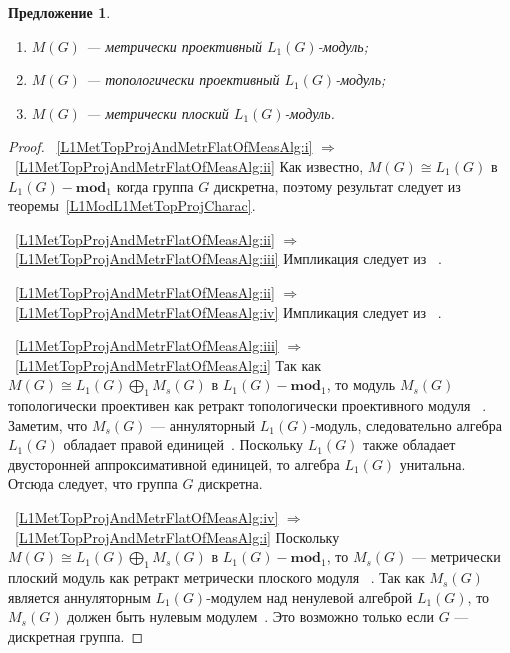 \documentclass{article}
\numberwithin{equation}{section}
\theoremstyle{plain}
\newtheorem{propos}{Предложение}
\theoremstyle{definition}
\newtheorem{proof}{Доказательство}\def\theproof{}
\newcommand{\isom}{\mathop{\mathbin{\cong}}}
\begin{document}
\begin{fulltext}
\begin{propos}
\begin{enumerate}[label = (\roman*)]
	\item $M(G)$ --- метрически проективный
	$L_1(G)$-модуль;\label{L1MetTopProjAndMetrFlatOfMeasAlg:ii}
 
	\item $M(G)$ --- топологически проективный
	$L_1(G)$-модуль;\label{L1MetTopProjAndMetrFlatOfMeasAlg:iii}
 
	\item $M(G)$ --- метрически плоский
	$L_1(G)$-модуль.\label{L1MetTopProjAndMetrFlatOfMeasAlg:iv}
\end{enumerate}
\end{propos}
\begin{proof} 
~\ref{L1MetTopProjAndMetrFlatOfMeasAlg:i} $\Longrightarrow$
~\ref{L1MetTopProjAndMetrFlatOfMeasAlg:ii} Как известно, $M(G)\isom L_1(G)$ в
$L_1(G)-\mathbf{mod}_1$ когда группа $G$ дискретна, поэтому результат следует из
теоремы~\ref{L1ModL1MetTopProjCharac}. 

~\ref{L1MetTopProjAndMetrFlatOfMeasAlg:ii} $\Longrightarrow$
~\ref{L1MetTopProjAndMetrFlatOfMeasAlg:iii} Импликация следует из
~\cite[предложение~2.4]{NemGeomProjInjFlatBanMod}.

~\ref{L1MetTopProjAndMetrFlatOfMeasAlg:ii} $\Longrightarrow$
~\ref{L1MetTopProjAndMetrFlatOfMeasAlg:iv} Импликация следует из
~\cite[предложение~2.26]{NemGeomProjInjFlatBanMod}.

~\ref{L1MetTopProjAndMetrFlatOfMeasAlg:iii} $\Longrightarrow$
~\ref{L1MetTopProjAndMetrFlatOfMeasAlg:i} Так как $M(G)\isom L_1(G)\bigoplus_1
M_s(G)$ в $L_1(G)-\mathbf{mod}_1$, то модуль $M_s(G)$ топологически проективен
как ретракт топологически проективного модуля
~\cite[предложение~2.2]{NemGeomProjInjFlatBanMod}. Заметим, что $M_s(G)$ ---
аннуляторный $L_1(G)$-модуль, следовательно алгебра $L_1(G)$ обладает правой
единицей~\cite[предложение~3.3]{NemGeomProjInjFlatBanMod}. Поскольку $L_1(G)$
также обладает двусторонней аппроксимативной единицей, то алгебра $L_1(G)$
унитальна. Отсюда следует, что группа $G$ дискретна.

~\ref{L1MetTopProjAndMetrFlatOfMeasAlg:iv} $\Longrightarrow$
~\ref{L1MetTopProjAndMetrFlatOfMeasAlg:i} Поскольку $M(G)\isom L_1(G)\bigoplus_1
M_s(G)$ в $L_1(G)-\mathbf{mod}_1$, то $M_s(G)$ --- метрически плоский модуль как
ретракт метрически плоского модуля
~\cite[предложение~2.27]{NemGeomProjInjFlatBanMod}. Так как $M_s(G)$ является
аннуляторным $L_1(G)$-модулем над ненулевой алгеброй $L_1(G)$, то $M_s(G)$
должен быть нулевым модулем~\cite[предложение~3.6]{NemGeomProjInjFlatBanMod}.
Это возможно только если $G$ --- дискретная группа.
\end{proof}


\end{fulltext}
\end{document}

